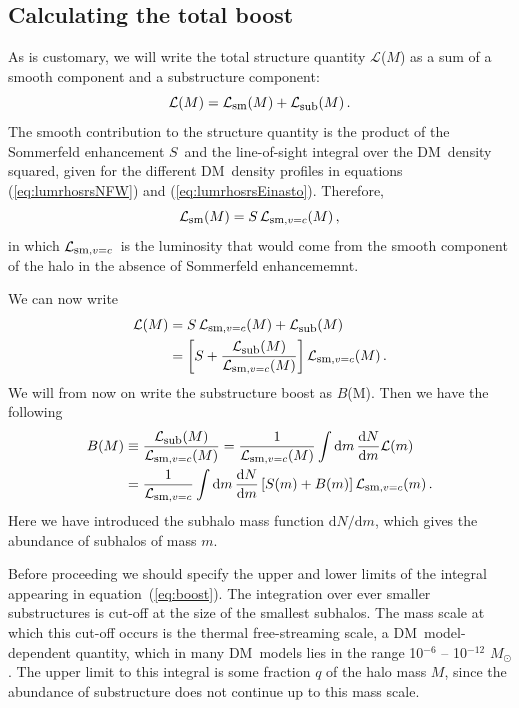 \documentclass[aps,prd,twocolumn,amsmath,amssymb,floatfix,nofootinbib,10pt]{revtex4}
\newcommand{\DM}{DM}
\newcommand{\somm}{\ensuremath{S}}
\newcommand{\dd}{\mathrm{d}}
\newcommand{\eqnname}{equation}
\newcommand{\lum}{\ensuremath{\mathcal{L}}}
\newcommand{\lumsmooth}{\ensuremath{\lum_{\mbox{{\footnotesize sm}}}}}
\newcommand{\lumsmoothc}{\ensuremath{\lum_{\mbox{{\footnotesize sm}},v=c}}}
\newcommand{\lumsub}{\ensuremath{\lum_{\mbox{{\footnotesize sub}}}}}
\newcommand{\boost}{\ensuremath{B}}
\newcommand{\Msol}{\ensuremath{M_{\odot}}}
\begin{document}
\subsection{Calculating the total boost}

As is customary, we will write the total structure quantity \lum($M$) as a
sum of a smooth component and a substructure component:
\begin{equation}
\lum(M) = \lumsmooth(M) + \lumsub(M)\, .
\end{equation}
The smooth contribution to the structure quantity is the product of
the Sommerfeld enhancement \somm\ and the line-of-sight integral over
the \DM\ density squared, given for the different \DM\ density
profiles in \eqnname s (\ref{eq:lumrhosrsNFW}) and
(\ref{eq:lumrhosrsEinasto}). Therefore,
\begin{equation}
\lumsmooth(M) = \somm \, \lumsmoothc(M)\, ,
\end{equation}
in which \lumsmoothc\ is the luminosity that would come from the
smooth component of the halo in the absence of Sommerfeld
enhancememnt.

We can now write
\begin{equation}
\begin{split}
\lum(M) & = \somm\,\lumsmoothc(M) + \lumsub(M)\\
&= \left[ \somm + \frac{\lumsub(M)}{\lumsmoothc(M)}\right] \lumsmoothc(M)\, .
\end{split}
\end{equation}
We will from now on write the substructure boost as \boost(M). Then we
have the following
\begin{equation}\label{eq:boost}
\begin{split}
\boost(M) & \equiv \frac{\lumsub(M)}{\lumsmoothc(M)} = \frac{1}{\lumsmoothc(M)} \int \dd m \, \frac{\dd N}{\dd m} \lum(m)\\
&= \frac{1}{\lumsmoothc} \int \dd m\, \frac{\dd N}{\dd m} \left[ \somm(m) + \boost(m) \right] \lumsmoothc(m)\, .
\end{split}
\end{equation}
Here we have introduced the subhalo mass function $\dd N/\dd m$, which
gives the abundance of subhalos of mass $m$.

Before proceeding we should specify the upper and lower limits of the
integral appearing in \eqnname\ (\ref{eq:boost}). The integration over
ever smaller substructures is cut-off at the size of the smallest
subhalos. The mass scale at which this cut-off occurs is the thermal
free-streaming scale, a \DM\ model-dependent quantity, which in many
\DM\ models lies in the range 10$^{-6}$ -- 10$^{-12}$ \Msol
\cite{1999PhRvD..59d3517S,2001PhRvD..64h3507H,2004MNRAS.353L..23G,2005PhRvD..71j3520L,2006PhRvL..97c1301P}. The
upper limit to this integral is some fraction $q$ of the halo mass
$M$, since the abundance of substructure does not continue up to this
mass scale.
\end{document}
